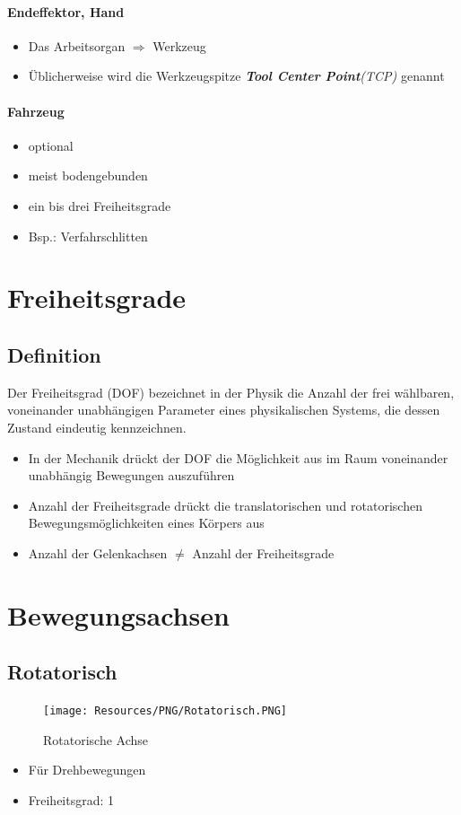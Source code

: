 \paragraph{Endeffektor, Hand}
\begin{itemize}
	\item Das Arbeitsorgan $\Rightarrow$ Werkzeug
	\item Üblicherweise wird die Werkzeugspitze \textit{\textbf{Tool Center Point}(TCP)} genannt
\end{itemize}
\paragraph{Fahrzeug}
\begin{itemize}
	\item optional
	\item meist bodengebunden
	\item ein bis drei Freiheitsgrade
	\item Bsp.: Verfahrschlitten
\end{itemize}
\section{Freiheitsgrade}
\subsection{Definition}
Der Freiheitsgrad (DOF) bezeichnet in der Physik die Anzahl der frei wählbaren, voneinander unabhängigen Parameter eines physikalischen Systems, die dessen Zustand eindeutig kennzeichnen.
\begin{itemize}
	\item In der Mechanik drückt der DOF die Möglichkeit aus im Raum voneinander unabhängig Bewegungen auszuführen
	\item Anzahl der Freiheitsgrade drückt die translatorischen und rotatorischen Bewegungsmöglichkeiten eines Körpers aus
	\item Anzahl der Gelenkachsen $\neq$ Anzahl der Freiheitsgrade
\end{itemize}
\section{Bewegungsachsen}
\subsection{Rotatorisch}
\begin{figure}[H]
	\begin{center}
		\texttt{[image: Resources/PNG/Rotatorisch.PNG]}
		\caption{Rotatorische Achse}
		\label{fig:PNG/Rotatorisch.PNG}
	\end{center}
\end{figure}
\begin{itemize}
	\item Für Drehbewegungen
	\item Freiheitsgrad: 1
\end{itemize}
